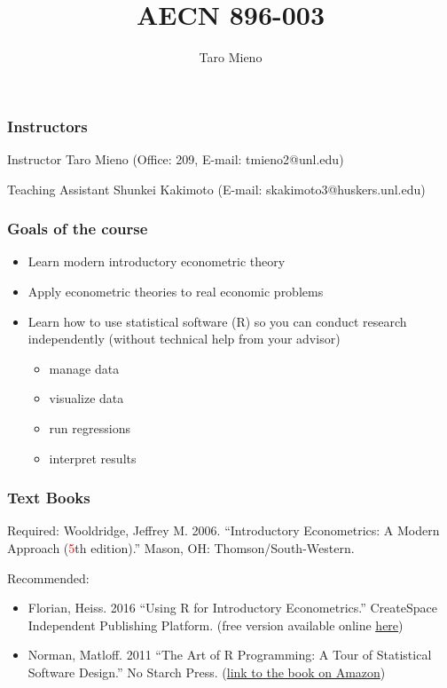 \documentclass[fleqn]{beamer}\usepackage[]{graphicx}\usepackage[]{color}
\begin{document}
\title{AECN 896-003}
\author{Taro Mieno}
\everymath{\displaystyle}

\begin{frame}
\titlepage
\end{frame}

\begin{frame}[c,fragile]
  \frametitle{Instructors}
  \begin{block}{Instructor}
    Taro Mieno (Office: 209, E-mail: tmieno2@unl.edu)
  \end{block}
  \begin{block}{Teaching Assistant}
    Shunkei Kakimoto (E-mail: skakimoto3@huskers.unl.edu)
  \end{block}
\end{frame}


\begin{frame}[c,fragile]
  \frametitle{Goals of the course}
  \begin{itemize}
    \item Learn modern introductory econometric theory
    \item Apply econometric theories to real economic problems
    \item Learn how to use statistical software (R) so you can conduct research independently (without technical help from your advisor)
    \begin{itemize}
      \item manage data
      \item visualize data
      \item run regressions
      \item interpret results
    \end{itemize}
  \end{itemize}
\end{frame}

\begin{frame}[c]
  \frametitle{Text Books}
  \begin{block}{Required:}
    Wooldridge, Jeffrey M. 2006. ``Introductory Econometrics: A Modern Approach (\textcolor{red}{5}th edition).'' Mason, OH: Thomson/South-Western.
  \end{block}
  \begin{block}{Recommended:}
  \begin{itemize}
    \item Florian, Heiss. 2016 ``Using R for Introductory Econometrics.'' CreateSpace Independent Publishing Platform. (free version available online \href{http://www.urfie.net/}{\underline{here}})
    \item Norman, Matloff. 2011 ``The Art of R Programming: A Tour of Statistical Software Design.'' No Starch Press. (\href{https://www.amazon.com/Art-Programming-Statistical-Software-Design/dp/1593273843}{link to the book on Amazon})
  \end{itemize}
  \end{block}
\end{frame}
\end{document}
